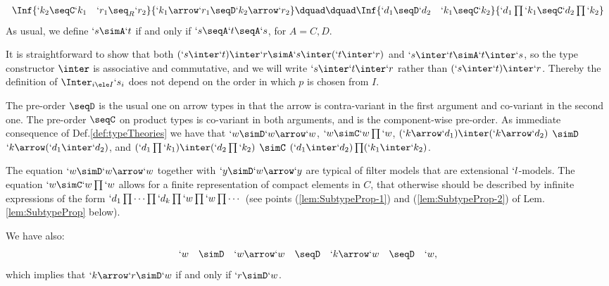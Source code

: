 \documentclass{CSML}
\begin{document}
\begin{defi} 
\begin{enumerate}
 \[ \begin{array}{c@{\dquad\dquad}c}
\Inf	{`k_2 \seqC `k_1 \quad `r_1 \seq_R `r_2
	}{ `k_1\arrow `r_1 \seqD `k_2\arrow `r_2 }
	&
\Inf	{`d_1 \seqD`d_2 \quad `k_1 \seqC `k_2
	}{ `d_1\prod `k_1 \seqC `d_2\prod `k_2 }
 \end{array} \]
%
As usual, we define $`s \simA `t$ if and only if $`s \seqA `t \seqA `s$, for $A = C,D$.

 \end{enumerate}
 \end{defi}

\noindent It is straightforward to show that both $(`s \inter `t) \inter `r \simA `s \inter (`t \inter `r)$ and $`s \inter `t \simA `t \inter `s$, so the type constructor $\inter$ is associative and commutative, and we will write $`s \inter `t \inter `r$ rather than $(`s \inter `t) \inter `r$.
Thereby the definition of $ \Inter_{i \ele I}`s_i $ does not depend on the order in which $p$ is chosen from $I$.

The pre-order $\seqD$ is the usual one on arrow types in that the arrow is contra-variant in the first argument and co-variant in the second one. 
The pre-order $\seqC$ on product types is co-variant in both arguments, and is the component-wise pre-order. 
As immediate consequence of Def.\skp\ref{def:typeTheories} we have that $`w \simD `w\arrow `w $, $`w \simC `w\prod `w $, 
$ (`k\arrow `d_1) \inter (`k\arrow `d_2) $ 
	$\simD$
$`k\arrow(`d_1 \inter`d_2) $,
and
$ (`d_1\prod `k_1) \inter (`d_2\prod `k_2) $
	$\simC$ 
$(`d_1 \inter `d_2)\prod (`k_1 \inter `k_2) $.

The equation $`w \simD `w\arrow `w $ together with $`y \simD `w\arrow `y $ are typical of filter models that are extensional $`l$-models.
The equation $`w \simC `w\prod `w $ allows for a finite representation of compact elements in $C$, that otherwise should be described by infinite expressions of the form $`d_1\prod \cdots\prod `d_k\prod `w\prod `w\prod \cdots$ (see points (\ref{lem:SubtypeProp-1}) and (\ref{lem:SubtypeProp-2}) of Lem.\skp\ref{lem:SubtypeProp} below). 

We have also:
%
 \[ \begin{array}{rcl@{\quad}lccc}
`w &\simD& `w\arrow `w &\seqD& `k\arrow `w &\seqD& `w ,
 \end{array} \]
which implies that $`k\arrow `r \simD `w $ if and only if $`r\simD`w $.
\end{document}

